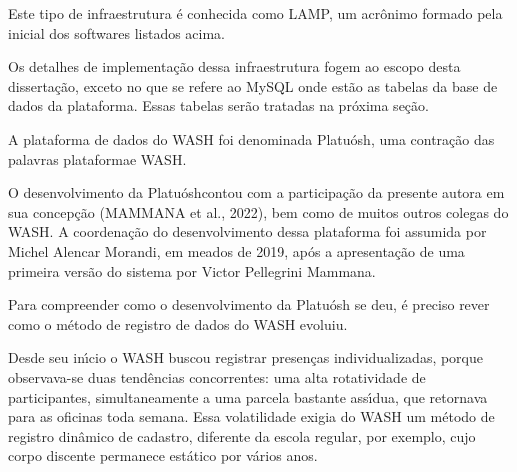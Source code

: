 \documentclass[
12pt,		%
openright,	%
twoside,  %
a4paper,			%
chapter=TITLE,		%
english,			%
french,				%
spanish,			%
brazil				%
]{USPSC-classe/USPSC}
\begin{document}
Este tipo de infraestrutura \'e conhecida como LAMP, um acr\^onimo formado pela inicial dos softwares listados acima.










Os detalhes de implementa\c{c}\~ao dessa infraestrutura fogem ao escopo desta disserta\c{c}\~ao, exceto no que se refere ao MySQL onde est\~ao as tabelas da base de dados da plataforma. Essas tabelas ser\~ao tratadas na pr\'oxima se\c{c}\~ao.










A plataforma de dados do WASH foi denominada \textquotedbl Platu\'osh\textquotedbl , uma contra\c{c}\~ao das palavras \textquotedbl plataforma\textquotedbl  e \textquotedbl WASH\textquotedbl .










O desenvolvimento da \textquotedbl Platu\'osh\textquotedbl  contou com a participa\c{c}\~ao da presente autora em sua concep\c{c}\~ao  (MAMMANA et al., 2022), bem como de muitos outros colegas do WASH. A coordena\c{c}\~ao do desenvolvimento dessa plataforma foi assumida por Michel Alencar Morandi, em meados de 2019, ap\'os a apresenta\c{c}\~ao de uma primeira vers\~ao do sistema por Victor Pellegrini Mammana.










Para compreender como o desenvolvimento da Platu\'osh se deu, \'e preciso rever como o m\'etodo de registro de dados do WASH evoluiu.










Desde seu in\'{\i}cio o WASH buscou registrar presen\c{c}as individualizadas, porque observava-se duas tend\^encias concorrentes: uma alta rotatividade de participantes, simultaneamente a uma parcela bastante ass\'{\i}dua, que retornava para as oficinas toda semana. Essa volatilidade exigia do WASH um m\'etodo de registro din\^amico de cadastro, diferente da escola regular, por exemplo, cujo corpo discente  permanece est\'atico por v\'arios anos.
\end{document}
